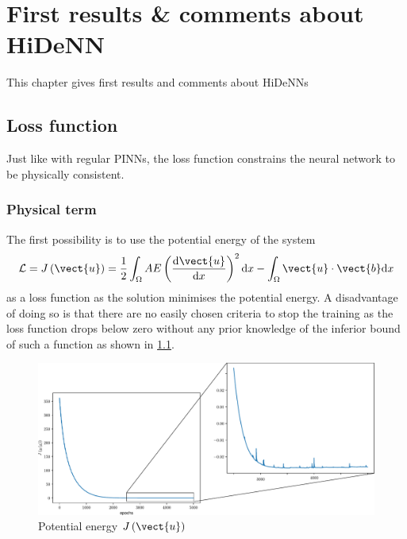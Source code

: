 \chapter[The 25$^{\text{th}}$ of January 2024 - First results \& comments about HiDeNN]{First results \& comments about HiDeNN}

\begin{chapabstract}
    This chapter gives first results and comments about HiDeNNs
\end{chapabstract}

\minitoc

\section{Loss function}
Just like with regular PINNs, the loss function constrains the neural network to be physically consistent.
\subsection{Physical term}
 The first possibility is to use the potential energy of the system 
\begin{equation}
    \mathcal{L} = J\left(\vect{u}\right) = \frac{1}{2}\int_{\Omega} AE\left(\frac{\mathrm{d}\vect{u}}{\mathrm{d}x}\right)^2\mathrm{d}x - \int_{\Omega} \vect{u} \cdot \vect{b} \mathrm{d}x
\end{equation}
as a loss function as the solution minimises the potential energy. A disadvantage of doing so is that there are no easily chosen criteria to stop the training as the loss function drops below zero without any prior knowledge of the inferior bound of such a function as shown in \cref{fig:Loss_zoom}.

\begin{figure}
    \centering
    \includegraphics[width=\linewidth]{Figures/Loss_with_zoom.pdf}
    \caption{Potential energy $J\left(\vect{u}\right)$}
    \label{fig:Loss_zoom}
\end{figure}

